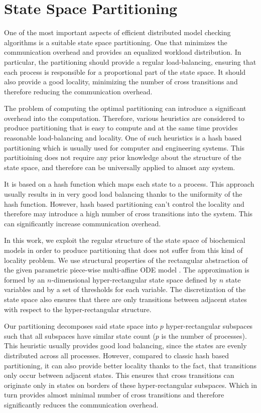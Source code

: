 \documentclass[12pt,oneside, draft]{fithesis2}
\begin{document}
		\section{State Space Partitioning}
			\label{sec:partitioning}
			One of the most important aspects of efficient distributed model checking algorithms is a suitable state space partitioning. One that minimizes the communication overhead and provides an equalized workload distribution. In particular, the partitioning should provide a regular load-balancing, ensuring that each process is responsible for a proportional part of the state space. It should also provide a good locality, minimizing the number of cross transitions and therefore reducing the communication overhead.
			
			The problem of computing the optimal partitioning can introduce a significant overhead into the computation. Therefore, various heuristics are considered to produce partitioning that is easy to compute and at the same time provides reasonable load-balancing and locality. One of such heuristics is a hash based partitioning \cite{spin} which is usually used for computer and engineering systems. This partitioining does not require any prior knowledge about the structure of the state space, and therefore can be universally applied to almost any system.
			
			It is based on a hash function which maps each state to a process. This approach usually results in in very good load balancing thanks to the uniformity of the hash function. However, hash based partitioning can't control the locality and therefore may introduce a high number of cross transitions into the system. This can significantly increase communication overhead.
			
			In this work, we exploit the regular structure of the state space of biochemical models in order to produce partitioning that does not suffer from this kind of locality problem. We use structural properties of the rectangular abstraction of the given parametric piece-wise multi-affine ODE model \cite{IFAC}. The approximation is formed by an $n$-dimensional hyper-rectangular state space defined by $n$ state variables and by a set of thresholds for each variable. The discretization of the state space also ensures that there are only transitions between adjacent states with respect to the hyper-rectangular structure.
			
			Our partitioning decomposes said state space into $p$ hyper-rectangular subspaces such that all subspaces have similar state count ($p$ is the number of processes). This heuristic usually provides good load balancing, since the states are evenly distributed across all processes. However, compared to classic hash based partitioning, it can also provide better locality thanks to the fact, that transitions only occur between adjacent states. This ensures that cross transitions can originate only in states on borders of these hyper-rectangular subspaces. Which in turn provides almost minimal number of cross transitions and therefore significantly reduces the communication overhead.
			
\end{document}
